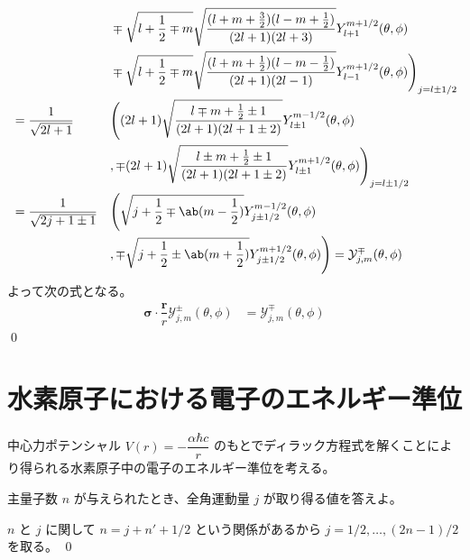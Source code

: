 \documentclass[uplatex,dvipdfmx,a4paper,11pt]{jlreq}
\makeatletter
\theoremstyle{definition}
\renewenvironment{proof}[1][\proofname]{\par
  \normalfont
  \topsep6\p@\@plus6\p@ \trivlist
  \item[\hskip\labelsep{\bfseries #1}\@addpunct{\bfseries}]\ignorespaces\quad\par
}{%
  \qed\endtrivlist\@endpefalse
}
\renewcommand\proofname{証明}
\newcommand{\rr}{\bm{r}}
\numberwithin{equation}{section}
\makeatother
\begin{document}
\begin{proof}
\begin{alignat}{3}
                                                                       &                                 &  & \mp\sqrt{l + \frac{1}{2} \mp m}\sqrt{\frac{(l + m + \frac{3}{2})(l - m + \frac{1}{2})}{(2l + 1)(2l + 3)}}Y_{l+1}^{m+1/2}(\theta, \phi)                                   \\
                                                                       &                                 &  & \mp\sqrt{l + \frac{1}{2} \mp m}\sqrt{\frac{(l + m + \frac{1}{2})(l - m - \frac{1}{2})}{(2l + 1)(2l - 1)}}Y_{l-1}^{m+1/2}(\theta, \phi)\Bigg)_{j = l\pm 1/2}              \\
                                                                       & = \frac{1}{\sqrt{2l + 1}}       &  & \Bigg((2l + 1)\sqrt{\frac{l \mp m + \frac{1}{2} \pm 1}{(2l + 1)(2l + 1 \pm 2)}}Y_{l\pm 1}^{m-1/2}(\theta, \phi)                                                          \\
                                                                       &                                 &  & ,\mp(2l + 1)\sqrt{\frac{l \pm m + \frac{1}{2} \pm 1}{(2l + 1)(2l + 1 \pm 2)}}Y_{l\pm 1}^{m+1/2}(\theta, \phi)\Bigg)_{j = l\pm 1/2}                                       \\
                                                                       & = \frac{1}{\sqrt{2j + 1 \pm 1}} &  & \Bigg(\sqrt{j + \frac{1}{2} \mp \ab(m - \frac{1}{2})}Y_{j\pm 1/2}^{m-1/2}(\theta, \phi)                                                                                  \\
                                                                       &                                 &  & ,\mp\sqrt{j + \frac{1}{2} \pm \ab(m + \frac{1}{2})}Y_{j\pm 1/2}^{m+1/2}(\theta, \phi)\Bigg) = \mathcal{Y}_{j, m}^\mp(\theta, \phi)
  \end{alignat}
  よって次の式となる。
  \begin{align}
    \bm{\sigma}\cdot\dfrac{\rr}{r}\mathcal{Y}_{j, m}^\pm(\theta, \phi) & = \mathcal{Y}_{j, m}^\mp(\theta, \phi)
  \end{align}
\end{proof}

\section{水素原子における電子のエネルギー準位}
\begin{problem}
中心力ポテンシャル $V(r) = -\dfrac{\alpha\hbar c}{r}$ のもとでディラック方程式を解くことにより得られる水素原子中の電子のエネルギー準位を考える。

主量子数 $n$ が与えられたとき、全角運動量 $j$ が取り得る値を答えよ。
\end{problem}
\begin{proof}
  $n$ と $j$ に関して $n = j + n' + 1/2$ という関係があるから $j = 1/2,\ldots,(2n-1)/2$ を取る。
\end{proof}
\end{document}
